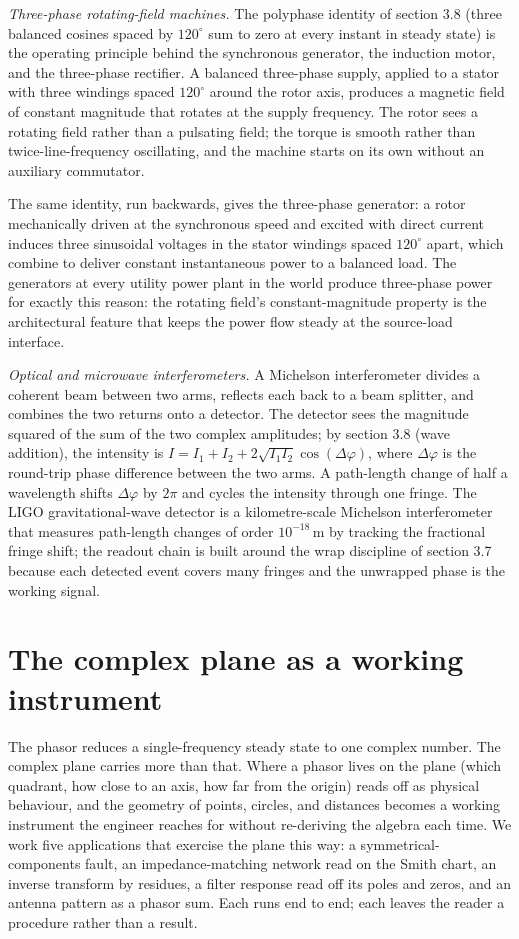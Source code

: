\textit{Three-phase rotating-field machines.} The polyphase
identity of section 3.8 (three balanced cosines spaced by
$120^{\circ}$ sum to zero at every instant in steady state) is the
operating principle behind the synchronous generator, the
induction motor, and the three-phase rectifier. A balanced
three-phase supply, applied to a stator with three windings spaced
$120^{\circ}$ around the rotor axis, produces a magnetic field of
constant magnitude that rotates at the supply frequency. The rotor
sees a rotating field rather than a pulsating field; the torque
is smooth rather than twice-line-frequency oscillating, and the
machine starts on its own without an auxiliary commutator.

The same identity, run backwards, gives the three-phase generator:
a rotor mechanically driven at the synchronous speed and excited
with direct current induces three sinusoidal voltages in the
stator windings spaced $120^{\circ}$ apart, which combine to
deliver constant instantaneous power to a balanced load. The
generators at every utility power plant in the world produce
three-phase power for exactly this reason: the rotating field's
constant-magnitude property is the architectural feature that
keeps the power flow steady at the source-load interface.

\textit{Optical and microwave interferometers.} A Michelson
interferometer divides a coherent beam between two arms, reflects
each back to a beam splitter, and combines the two returns onto a
detector. The detector sees the magnitude squared of the sum of
the two complex amplitudes; by section 3.8 (wave addition), the
intensity is
$I = I_{1} + I_{2} + 2\sqrt{I_{1} I_{2}}\cos(\Delta\varphi)$,
where $\Delta\varphi$ is the round-trip phase difference between
the two arms. A path-length change of half a wavelength shifts
$\Delta\varphi$ by $2\pi$ and cycles the intensity through one
fringe. The LIGO gravitational-wave detector is a kilometre-scale
Michelson interferometer that measures path-length changes of
order $10^{-18}\,\si{\meter}$ by tracking the fractional fringe
shift; the readout chain is built around the wrap discipline of
section 3.7 because each detected event covers many fringes and
the unwrapped phase is the working signal.

\section{The complex plane as a working instrument}

The phasor reduces a single-frequency steady state to one complex
number. The complex plane carries more than that. Where a phasor lives
on the plane (which quadrant, how close to an axis, how far from the
origin) reads off as physical behaviour, and the geometry of points,
circles, and distances becomes a working instrument the engineer reaches
for without re-deriving the algebra each time. We work five applications
that exercise the plane this way: a symmetrical-components fault, an
impedance-matching network read on the Smith chart, an inverse transform
by residues, a filter response read off its poles and zeros, and an
antenna pattern as a phasor sum. Each runs end to end; each leaves the
reader a procedure rather than a result.

